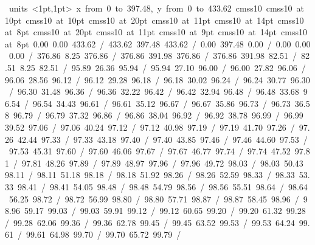 \hbox{\beginpicture
\setcoordinatesystem units <1pt,1pt>
\setplotarea x from 0 to 397.48, y from 0 to 433.62
\setlinear
\font\picfont cmss10\picfont
\font\picfont cmss10 at 10pt\picfont
\font\picfont cmss10 at 10pt\picfont
\font\picfont cmss10 at 20pt\picfont
\font\picfont cmss10 at 11pt\picfont
\font\picfont cmss10 at 14pt\picfont
\font\picfont cmss10 at 8pt\picfont
\font\picfont cmss10 at 20pt\picfont
\font\picfont cmss10 at 11pt\picfont
\font\picfont cmss10 at 9pt\picfont
\font\picfont cmss10 at 14pt\picfont
\font\picfont cmss10 at 8pt\picfont
\setsolid
{} 0.00 0.00 433.62 /
 433.62 397.48 433.62 /
 0.00 397.48 0.00 /
 0.00 0.00 0.00 /
\setsolid
{} 376.86 8.25 376.86 /
 376.86 391.98 376.86 /
 376.86 391.98 82.51 /
 82.51 8.25 82.51 /
\setsolid
{} 95.89 26.36 95.94 /
 95.94 27.10 96.00 /
 96.00 27.82 96.06 /
 96.06 28.56 96.12 /
 96.12 29.28 96.18 /
 96.18 30.02 96.24 /
 96.24 30.77 96.30 /
 96.30 31.48 96.36 /
 96.36 32.22 96.42 /
 96.42 32.94 96.48 /
 96.48 33.68 96.54 /
 96.54 34.43 96.61 /
 96.61 35.12 96.67 /
 96.67 35.86 96.73 /
 96.73 36.58 96.79 /
 96.79 37.32 96.86 /
 96.86 38.04 96.92 /
 96.92 38.78 96.99 /
 96.99 39.52 97.06 /
 97.06 40.24 97.12 /
 97.12 40.98 97.19 /
 97.19 41.70 97.26 /
 97.26 42.44 97.33 /
 97.33 43.18 97.40 /
 97.40 43.85 97.46 /
 97.46 44.60 97.53 /
 97.53 45.31 97.60 /
 97.60 46.06 97.67 /
 97.67 46.77 97.74 /
 97.74 47.52 97.81 /
 97.81 48.26 97.89 /
 97.89 48.97 97.96 /
 97.96 49.72 98.03 /
 98.03 50.43 98.11 /
 98.11 51.18 98.18 /
 98.18 51.92 98.26 /
 98.26 52.59 98.33 /
 98.33 53.33 98.41 /
 98.41 54.05 98.48 /
 98.48 54.79 98.56 /
 98.56 55.51 98.64 /
 98.64 56.25 98.72 /
 98.72 56.99 98.80 /
 98.80 57.71 98.87 /
 98.87 58.45 98.96 /
 98.96 59.17 99.03 /
 99.03 59.91 99.12 /
 99.12 60.65 99.20 /
 99.20 61.32 99.28 /
 99.28 62.06 99.36 /
 99.36 62.78 99.45 /
 99.45 63.52 99.53 /
 99.53 64.24 99.61 /
 99.61 64.98 99.70 /
 99.70 65.72 99.79 /
}
